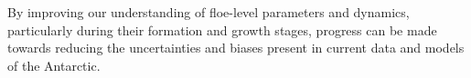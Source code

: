 By improving our understanding of floe-level parameters and dynamics, particularly during their formation and growth stages, progress can be made towards reducing the uncertainties and biases present in current data and models of the Antarctic.

